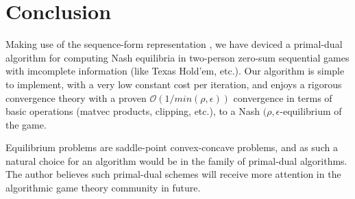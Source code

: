 \documentclass{article} %
\begin{document}
\section{Conclusion}
Making use of the sequence-form representation
\cite{koller1992complexity,von1996efficient,vonequilibrium}, we have
deviced a primal-dual algorithm for computing Nash equilibria in
two-person zero-sum sequential games with imcomplete information (like
Texas Hold'em, etc.). Our algorithm is simple to implement, with a
very low constant cost per iteration, and enjoys a rigorous
convergence theory with a proven $\mathcal{O}(1/min(\rho,\epsilon))$ convergence
in terms of basic operations (matvec products, clipping, etc.), to a
Nash $(\rho,\epsilon$-equilibrium of the game.

Equilibrium problems are saddle-point convex-concave problems, and as
such a natural choice for an algorithm would be in the family of
primal-dual algorithms. The author believes such primal-dual schemes
will receive more attention in the algorithmic game theory community
in future.


\medskip \noindent

\small


\end{document}
